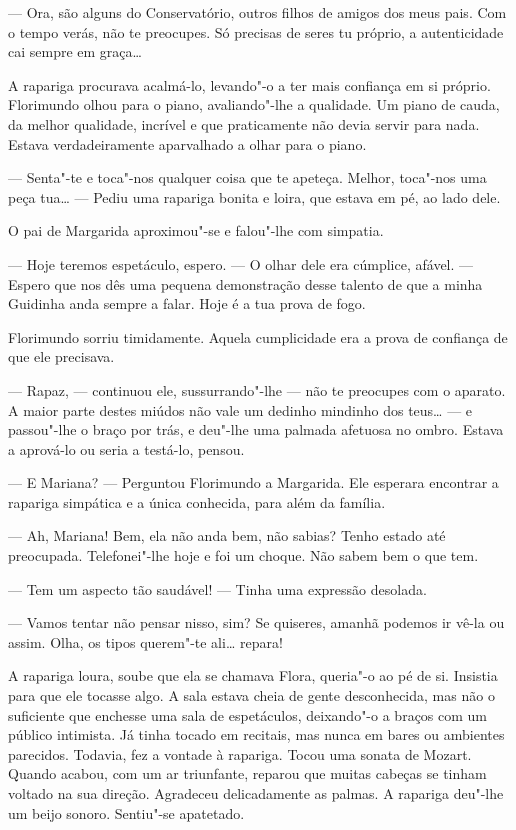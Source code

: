 --- Ora, são alguns do Conservatório, outros filhos de amigos dos meus
pais. Com o tempo verás, não te preocupes. Só precisas de seres tu
próprio, a autenticidade cai sempre em graça\ldots{}

A rapariga procurava acalmá-lo, levando"-o a ter mais confiança em si
próprio. Florimundo olhou para o piano, avaliando"-lhe a qualidade. Um
piano de cauda, da melhor qualidade, incrível e que praticamente não
devia servir para nada. Estava verdadeiramente aparvalhado a olhar para
o piano.

--- Senta"-te e toca"-nos qualquer coisa que te apeteça. Melhor, toca"-nos
uma peça tua\ldots{} --- Pediu uma rapariga bonita e loira, que estava em pé,
ao lado dele.

O pai de Margarida aproximou"-se e falou"-lhe com simpatia.

--- Hoje teremos espetáculo, espero. --- O olhar dele era cúmplice, afável.
--- Espero que nos dês uma pequena demonstração desse talento de que a
minha Guidinha anda sempre a falar. Hoje é a tua prova de fogo.

Florimundo sorriu timidamente. Aquela cumplicidade era a prova de
confiança de que ele precisava.

--- Rapaz, --- continuou ele, sussurrando"-lhe --- não te preocupes com o
aparato. A maior parte destes miúdos não vale um dedinho mindinho dos
teus\ldots{} --- e passou"-lhe o braço por trás, e deu"-lhe uma palmada afetuosa
no ombro. Estava a aprová-lo ou seria a testá-lo, pensou.

--- E Mariana? --- Perguntou Florimundo a Margarida. Ele esperara encontrar
a rapariga simpática e a única conhecida, para além da família.

--- Ah, Mariana! Bem, ela não anda bem, não sabias? Tenho estado até
preocupada. Telefonei"-lhe hoje e foi um choque. Não sabem bem o que tem.

--- Tem um aspecto tão saudável! --- Tinha uma expressão desolada.

--- Vamos tentar não pensar nisso, sim? Se quiseres, amanhã podemos ir
vê-la ou assim. Olha, os tipos querem"-te ali\ldots{} repara!

A rapariga loura, soube que ela se chamava Flora, queria"-o ao pé de si.
Insistia para que ele tocasse algo. A sala estava cheia de gente
desconhecida, mas não o suficiente que enchesse uma sala de
espetáculos, deixando"-o a braços com um público intimista. Já tinha
tocado em recitais, mas nunca em bares ou ambientes parecidos. Todavia,
fez a vontade à rapariga. Tocou uma sonata de Mozart. Quando acabou, com
um ar triunfante, reparou que muitas cabeças se tinham voltado na sua
direção. Agradeceu delicadamente as palmas. A rapariga deu"-lhe um beijo
sonoro. Sentiu"-se apatetado.

